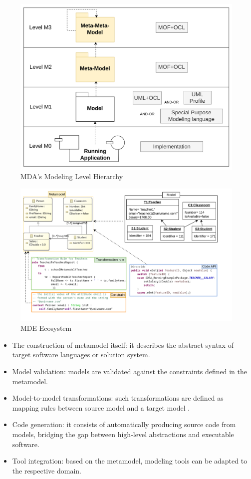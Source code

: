 \begin{figure}[htbp]
	\begin{center}
		\includegraphics[width=0.6\linewidth]{./pics/soaPics/mofmodellevels2.png}
	\end{center}
	\caption{MDA’s Modeling Level Hierarchy}
	\label{fig:mofmodellevels}
\end{figure}
\begin{figure}[htbp]
	\begin{center}
		\includegraphics[width=\linewidth]{./pics/soaPics/notabstractecosystem2.png}
	\end{center}
	\caption{MDE Ecosystem}
	\label{fig:mde_ecosystem}
\end{figure}
\begin{itemize}
\item The construction of metamodel itself: it describes the abstract syntax of target software languages or  solution system.
\item Model validation: models are validated against the constraints defined in the metamodel. 
\item Model-to-model transformations: such transformations are defined as mapping rules between source model and a target model .
\item Code generation: it consists of automatically producing source code from models, bridging the gap between high-level abstractions and executable software.
\item Tool integration: based on the metamodel, modeling tools can be adapted to the respective domain. 
\end{itemize}



